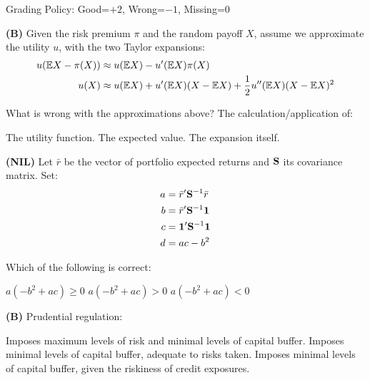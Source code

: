 \documentclass{exam}
\begin{document}
\noindent
{}


\bigskip\noindent 
Grading Policy: Good=$+2$, Wrong=$-1$, Missing=$0$

\begin{questions}

\question \textbf{(B)}
Given the  risk premium $\pi$ and the random payoff $X$, assume we approximate the utility $u$, with the two  Taylor expansions:
\begin{align*}
u(\ex X - \pi(X)) &\approx  u(\ex X) - u'(\ex X) \pi(X) \\
u(X) &\approx u(\ex X) + u'(\ex X) (X-\ex X) + \frac{1}{2} u''(\ex X)(X-\ex X)^2
\end{align*}
  
What is wrong with the approximations above? The calculation/application of:
\begin{choices}
\CorrectChoice  The utility function.
\choice  The expected value.
\choice  The expansion itself.
\end{choices}

\question \textbf{(NIL)}
Let  $\bar{r}$ be the vector of portfolio expected returns and  $\ss$ its covariance matrix. Set:
\begin{align*}
a&= \bar{r}'\ss^{-1} \bar{r}\\
b&= \bar{r}'\ss^{-1} \one \\
c&= \one'\ss^{-1} \one\\
d&= ac-b^2
\end{align*}

Which of the following is correct:
\begin{choices}
  \choice $
a( - b^2 +ac)\geq0
$
\CorrectChoice
$
a( - b^2 +ac) >0
$
\choice
$
a( - b^2 +ac) <0
$

\end{choices}

\question \textbf{(B)}
Prudential regulation:
\begin{choices}
\choice        Imposes maximum levels of risk and  minimal levels of capital buffer.
\CorrectChoice Imposes minimal levels of capital buffer, adequate to risks taken.
\choice        Imposes minimal levels of capital buffer, given the riskiness of credit exposures.
\end{choices}


\end{questions}
\end{document}
